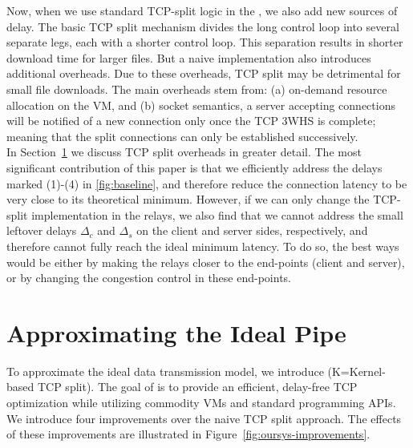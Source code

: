  Now, when we use standard TCP-split logic in the \relays, we also add new sources of delay. 
The basic TCP split mechanism divides the long control loop into several separate legs, each with a shorter control loop. This separation results in shorter download time for larger files. But a naive implementation also introduces additional overheads. Due to these overheads, TCP split may be detrimental for small file downloads. The main overheads stem from: (a) on-demand resource allocation on the VM, and (b) socket semantics, a server accepting connections will be notified of a new connection only once the TCP 3WHS is complete; meaning that the split connections can only be established successively.\\
In Section~\ref{sec:approx} we discuss TCP split overheads in greater detail.  The most significant contribution of this paper is that we efficiently address the delays marked (1)-(4) in \autoref{fig:baseline}, and therefore reduce the connection latency to be very close to its theoretical minimum. However, if we can only change the TCP-split implementation in the relays, we also find that we cannot address the small leftover delays $\Delta_c$ and $\Delta_s$ on the client and server sides, respectively, and therefore cannot fully reach the ideal minimum latency. To do so, the best ways would be either by making the relays closer to the end-points (client and server), or by changing the congestion control in these end-points. %

\section{Approximating the Ideal Pipe}\label{sec:approx}

To approximate the ideal data transmission model, we introduce \textit{\oursys}(K=Kernel-based TCP split).
The goal of \oursys is to provide an efficient, delay-free TCP optimization while utilizing commodity VMs and standard programming APIs. We introduce four improvements over the naive TCP split approach. The effects of these improvements are illustrated in Figure~\ref{fig:oursys-improvements}. 


